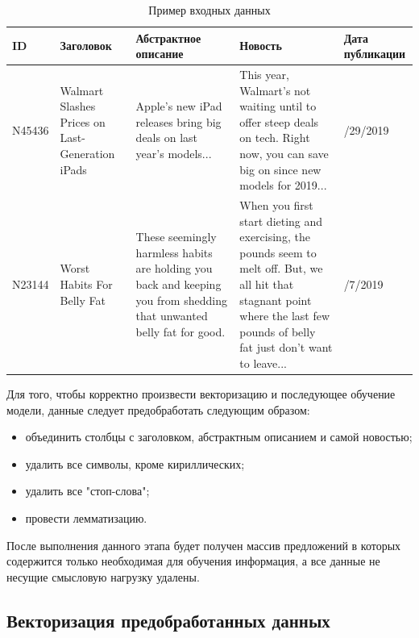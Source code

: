 \begin{table}[H]
	\caption{Пример входных данных}
	\label{input_data}
	\begin{center}
		\begin{tabularx}{1\textwidth}{ 
				| >{\centering\arraybackslash}X 
				| >{\centering\arraybackslash}X 
				| >{\centering\arraybackslash}X
				| >{\centering\arraybackslash}X 
				| >{\centering\arraybackslash}X | }
			\hline
			ID & Заголовок & Абстрактное описание & Новость & Дата публикации \\ 
			\hline
			N45436 & Walmart Slashes Prices on Last-Generation iPads & Apple's new iPad releases bring big deals on last year's models... &  This year, Walmart’s not waiting until to offer steep deals on tech. Right now, you can save big on since new models for 2019... & 10/29/2019 \\ 
			\hline
			N23144	& 50 Worst Habits For Belly Fat & These seemingly harmless habits are holding you back and keeping you from shedding that unwanted belly fat for good. & When you first start dieting and exercising, the pounds seem to melt off. But, we all hit that stagnant point where the last few pounds of belly fat just don’t want to leave... & 5/7/2019 \\ 
			\hline
		\end{tabularx}
	\end{center}
\end{table}

Для того, чтобы корректно произвести векторизацию и последующее обучение модели, данные следует предобработать следующим образом:

\begin{itemize}
	\item объединить столбцы с заголовком, абстрактным описанием и самой новостью;
	\item удалить все символы, кроме кириллических;
	\item удалить все "стоп-слова";
	\item провести лемматизацию.
\end{itemize}

После выполнения данного этапа будет получен массив предложений в которых содержится только необходимая для обучения информация, а все данные не несущие смысловую нагрузку удалены.

\subsection{Векторизация предобработанных данных}

